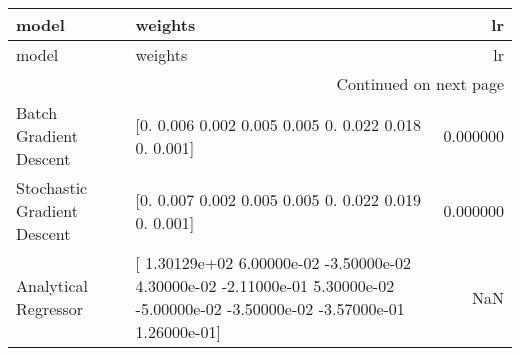 \begin{longtable}{llr}
\toprule
model & weights & lr \\
\midrule
\endfirsthead
\toprule
model & weights & lr \\
\midrule
\endhead
\midrule
\multicolumn{3}{r}{Continued on next page} \\
\midrule
\endfoot
\bottomrule
\endlastfoot
Batch Gradient Descent & [0.    0.006 0.002 0.005 0.005 0.    0.022 0.018 0.    0.001] & 0.000000 \\
Stochastic Gradient Descent & [0.    0.007 0.002 0.005 0.005 0.    0.022 0.019 0.    0.001] & 0.000000 \\
Analytical Regressor & [ 1.30129e+02  6.00000e-02 -3.50000e-02  4.30000e-02 -2.11000e-01
  5.30000e-02 -5.00000e-02 -3.50000e-02 -3.57000e-01  1.26000e-01] & NaN \\
\end{longtable}
